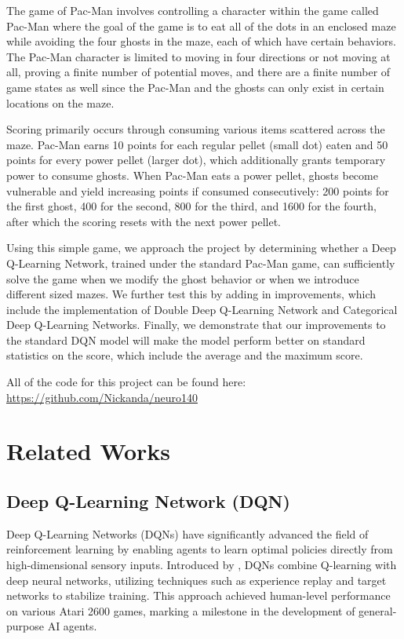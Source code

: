 \documentclass{article} %
\begin{document}
The game of Pac-Man involves controlling a character within the game called Pac-Man where the goal of the game is to eat all of the dots in an enclosed maze while avoiding the four ghosts in the maze, each of which have certain behaviors. The Pac-Man character is limited to moving in four directions or not moving at all, proving a finite number of potential moves, and there are a finite number of game states as well since the Pac-Man and the ghosts can only exist in certain locations on the maze.

Scoring primarily occurs through consuming various items scattered across the maze. Pac-Man earns 10 points for each regular pellet (small dot) eaten and 50 points for every power pellet (larger dot), which additionally grants temporary power to consume ghosts. When Pac-Man eats a power pellet, ghosts become vulnerable and yield increasing points if consumed consecutively: 200 points for the first ghost, 400 for the second, 800 for the third, and 1600 for the fourth, after which the scoring resets with the next power pellet.

Using this simple game, we approach the project by determining whether a Deep Q-Learning Network, trained under the standard Pac-Man game, can sufficiently solve the game when we modify the ghost behavior or when we introduce different sized mazes. We further test this by adding in improvements, which include the implementation of Double Deep Q-Learning Network and Categorical Deep Q-Learning Networks. Finally, we demonstrate that our improvements to the standard DQN model will make the model perform better on standard statistics on the score, which include the average and the maximum score.

All of the code for this project can be found here: \url{https://github.com/Nickanda/neuro140}

\section{Related Works}

\subsection{Deep Q-Learning Network (DQN)}

Deep Q-Learning Networks (DQNs) have significantly advanced the field of reinforcement learning by enabling agents to learn optimal policies directly from high-dimensional sensory inputs. Introduced by \cite{mnih2015human}, DQNs combine Q-learning with deep neural networks, utilizing techniques such as experience replay and target networks to stabilize training. This approach achieved human-level performance on various Atari 2600 games, marking a milestone in the development of general-purpose AI agents.
\end{document}
